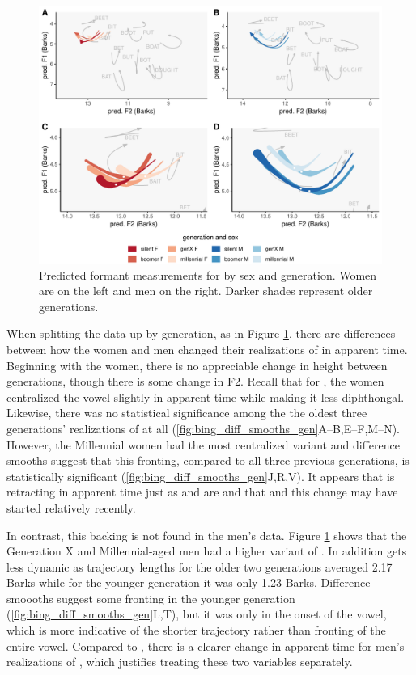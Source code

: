 \begin{figure}[tb!]
	\centering
	\includegraphics[width = 6.5in]{Figures/BING/BING_four_panel_plot.pdf}
	\caption[Predicted formant measurements for \bing by sex and generation.]{Predicted formant measurements for \bing by sex and generation. Women are on the left and men on the right. Darker shades represent older generations.}
	\label{fig:BING_four_panel}
\end{figure}

When splitting the data up by generation, as in Figure \ref{fig:BING_four_panel}, there are differences between how the women and men changed their realizations of \bing in apparent time. Beginning with the women, there is no appreciable change in height between generations, though there is some change in F2. Recall that for \bin, the women centralized the vowel slightly in apparent time while making it less diphthongal. Likewise, there was no statistical significance among the the oldest three generations' realizations of \bing at all (\ref{fig:bing_diff_smooths_gen}A--B,E--F,M--N). However, the Millennial women had the most centralized variant and difference smooths suggest that this fronting, compared to all three previous generations, is statistically significant (\ref{fig:bing_diff_smooths_gen}J,R,V). It appears that \bing is retracting in apparent time just as \bin and \bit are and that and this change may have started relatively recently.

In contrast, this backing is not found in the men's data. Figure \ref{fig:BING_four_panel} shows that the Generation X and Millennial-aged men had a higher variant of \bing. In addition \bing gets less dynamic as trajectory lengths for the older two generations averaged 2.17 Barks while for the younger generation it was only 1.23 Barks. Difference smoooths suggest some fronting in the younger generation (\ref{fig:bing_diff_smooths_gen}L,T), but it was only in the onset of the vowel, which is more indicative of the shorter trajectory rather than fronting of the entire vowel. Compared to \bin, there is a clearer change in apparent time for men's realizations of \bing, which justifies treating these two variables separately.

